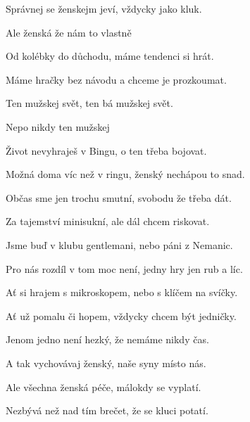 

\zs
Správnej  se ženskejm jeví, vždycky  jako kluk.

Ale  ženská  že  nám to vlastně 

Od kolébky do důchodu, máme tendenci si hrát.

Máme hračky bez návodu a chceme je prozkoumat.
\ks

\zr
Ten  mužskej svět, ten bá mužskej svět.

Nepo nikdy  ten  mužskej 
\kr

\zs
Život nevyhraješ v Bingu, o ten třeba bojovat.

Možná doma víc než v ringu, ženský nechápou to snad.

Občas sme jen trochu smutní, svobodu že třeba dát.

Za tajemství minisukní, ale dál chcem riskovat.
\ks

\zr\kr

\zs
Jsme buď v klubu gentlemani, nebo páni z Nemanic.

Pro nás rozdíl v tom moc není, jedny hry jen rub a líc.

Ať si hrajem s mikroskopem, nebo s klíčem na svíčky.

Ať už pomalu či hopem, vždycky chcem být jedničky.
\ks

\zr \kr

\zs
Jenom jedno není hezký, že nemáme nikdy čas.

A tak vychovávaj ženský, naše syny místo nás.

Ale všechna ženská péče, málokdy se vyplatí.

Nezbývá než nad tím brečet, že se kluci potatí.
\ks

\zr \kr

\kp



